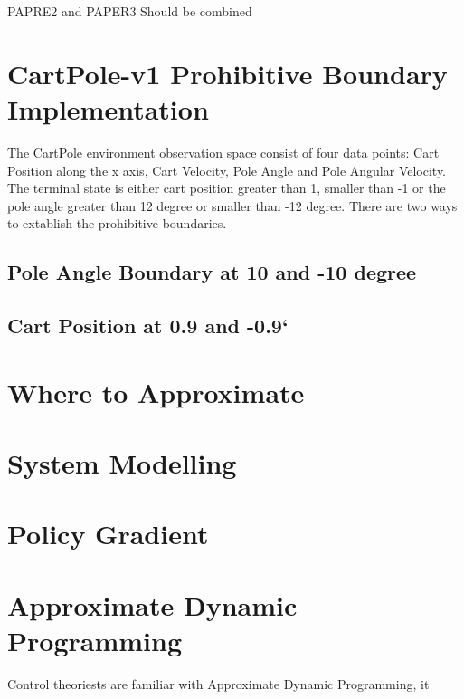 \documentclass[journal]{IEEEtran}
\begin{document}
PAPRE2 and PAPER3 Should be combined








\section{CartPole-v1 Prohibitive Boundary Implementation}
The CartPole environment observation space consist of four data points: Cart Position along the x axis, Cart Velocity, Pole Angle and Pole Angular Velocity. The terminal state is either cart position greater than 1, smaller than -1 or the pole angle greater than 12 degree or smaller than -12 degree. There are two ways to extablish the prohibitive boundaries.

\subsection{Pole Angle Boundary at 10 and -10 degree}

\subsection{Cart Position at 0.9 and -0.9`}



\section{Where to Approximate}



\section{System Modelling}

\section{Policy Gradient}

\section{Approximate Dynamic Programming}
Control theoriests are familiar with Approximate Dynamic Programming, it
\end{document}
